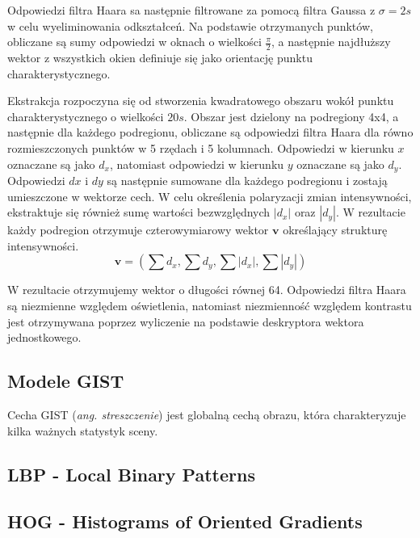 Odpowiedzi filtra Haara sa następnie filtrowane za pomocą filtra Gaussa z $\sigma = 2s$ w celu wyeliminowania odkształceń. Na podstawie otrzymanych punktów, obliczane są sumy odpowiedzi w oknach o wielkości $\frac{\pi}{2}$, a następnie najdłuższy wektor z wszystkich okien definiuje się jako orientację punktu charakterystycznego.

Ekstrakcja rozpoczyna się od stworzenia kwadratowego obszaru wokół punktu charakterystycznego o wielkości $20s$. Obszar jest dzielony na podregiony 4x4, a następnie dla każdego podregionu, obliczane są odpowiedzi filtra Haara dla równo rozmieszczonych punktów w 5 rzędach i 5 kolumnach. Odpowiedzi  w kierunku $x$ oznaczane są jako $d_x$, natomiast odpowiedzi w kierunku $y$ oznaczane są jako $d_y$. Odpowiedzi $dx$ i $dy$ są następnie sumowane dla każdego podregionu i zostają umieszczone w wektorze cech. W celu określenia polaryzacji zmian intensywności, ekstraktuje się również sumę wartości bezwzględnych $|d_x|$ oraz $|d_y|$. W rezultacie każdy podregion otrzymuje czterowymiarowy wektor $\boldsymbol{v}$ określający strukturę intensywności.
\begin{equation} 
\label{surf_v_vector} 
\boldsymbol{v} = (\sum{d_x}, \sum{d_y}, \sum{|d_x|}, \sum{|d_y|})
\end{equation}

W rezultacie otrzymujemy wektor o długości równej 64. Odpowiedzi filtra Haara są niezmienne względem oświetlenia, natomiast niezmienność względem kontrastu jest otrzymywana poprzez wyliczenie na podstawie deskryptora wektora jednostkowego.

\subsection{Modele GIST}

Cecha GIST (\emph{ang. streszczenie}) jest globalną cechą obrazu, która charakteryzuje kilka ważnych statystyk sceny. 



\subsection{LBP - Local Binary Patterns}

\subsection{HOG - Histograms of Oriented Gradients}


